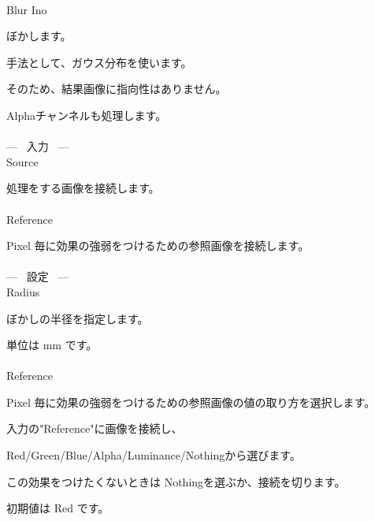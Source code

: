 \documentclass[a4paper,12pt]{article}
\begin{document}
\thispagestyle{empty}

\Large
\noindent \\
Blur Ino\medskip
\par
\normalsize
ぼかします。\\
\par
手法として、ガウス分布を使います。\par
そのため、結果画像に指向性はありません。\\
\par
Alphaチャンネルも処理します。\\
\\
--- \ 入力 \ ---\\
Source\par
処理をする画像を接続します。\\
\\
Reference\par
Pixel 毎に効果の強弱をつけるための参照画像を接続します。\\
\\
--- \ 設定 \ ---\\
Radius\par
ぼかしの半径を指定します。\par
単位は mm です。\\
\\
Reference\par
Pixel 毎に効果の強弱をつけるための参照画像の値の取り方を選択します。\par
入力の"Reference"に画像を接続し、\par
Red/Green/Blue/Alpha/Luminance/Nothingから選びます。\par
この効果をつけたくないときは Nothingを選ぶか、接続を切ります。\par
初期値は Red です。
\end{document}
